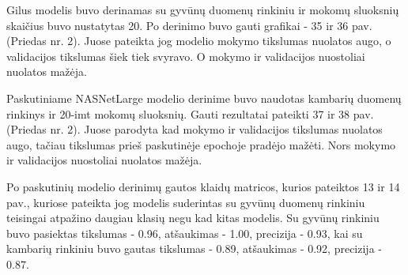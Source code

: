 \documentclass{VUMIFPSbakalaurinis}
\begin{document}
Gilus modelis buvo derinamas su gyvūnų duomenų rinkiniu ir mokomų sluoksnių skaičius buvo nustatytas 20.
Po derinimo buvo gauti grafikai - 35 ir 36 pav. (Priedas nr. 2). Juose pateikta jog modelio mokymo tikslumas nuolatos augo, o validacijos tikslumas šiek tiek svyravo. O mokymo ir validacijos nuostoliai nuolatos mažėja.

Paskutiniame NASNetLarge modelio derinime buvo naudotas kambarių duomenų rinkinys ir 20-imt mokomų sluoksnių.
Gauti rezultatai pateikti 37 ir 38 pav. (Priedas nr. 2). Juose parodyta kad mokymo ir validacijos tikslumas nuolatos augo, tačiau tikslumas prieš paskutinėje epochoje pradėjo mažėti. Nors mokymo ir validacijos nuostoliai nuolatos mažėja.

Po paskutinių modelio derinimų gautos klaidų matricos, kurios pateiktos 13 ir 14 pav., kuriose pateikta jog modelis suderintas su gyvūnų duomenų rinkiniu teisingai atpažino daugiau klasių negu kad kitas modelis.
Su gyvūnų rinkiniu buvo pasiektas tikslumas - 0.96, atšaukimas - 1.00, precizija - 0.93, kai su kambarių rinkiniu buvo gautas tikslumas - 0.89, atšaukimas - 0.92, precizija - 0.87.
\end{document}

